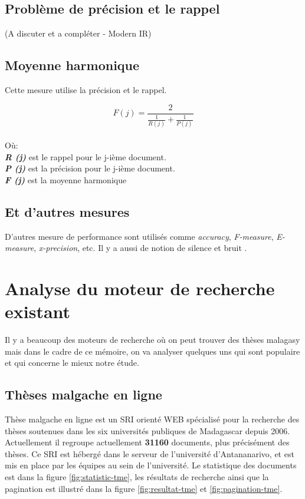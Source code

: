 \subsection{Problème de précision et le rappel}
(A discuter et a compléter - Modern IR)

\subsection{Moyenne harmonique}
Cette mesure utilise la précision et le rappel.

\[
	F(j) = \frac{2}{\frac{1}{R(j)} + \frac{1}{P(j)}}
\]
\\Où:\\
\textbf{\textit{R (j)}} est le rappel pour le j-ième document.\\
\textbf{\textit{P (j)}} est la précision pour le j-ième document.\\
\textbf{\textit{F (j)}} est la moyenne harmonique

\subsection{Et d'autres mesures}
D'autres mesure de performance sont utilisés comme \textit{accuracy}, \textit{F-measure}, \textit{E-measure}, \textit{x-precision}, etc. Il y a aussi de notion de silence et bruit \citep*{modern-ir, amelioration-ri-approche-semantique}.

\section{Analyse du moteur de recherche existant}
Il y a beaucoup des moteurs de recherche où on peut trouver des thèses malagasy mais dans le cadre de ce mémoire, on va analyser quelques uns qui sont populaire et qui concerne le mieux notre étude.

\subsection{Thèses malgache en ligne}
Thèse malgache en ligne \citep{these-malgache-en-ligne} est un SRI orienté WEB spécialisé pour la recherche des thèses soutenues dans les six universités publiques de Madagascar depuis 2006. Actuellement il regroupe actuellement \textbf{31160} documents, plus précisément des thèses. Ce SRI est hébergé dans le serveur de l'université d'Antananarivo, et est mis en place par les équipes au sein de l'université. Le statistique des documents est dans la figure \ref{fig:statistic-tme}, les résultats de recherche ainsi que la pagination est illustré dans la figure \ref{fig:resultat-tme} et \ref{fig:pagination-tme}.

